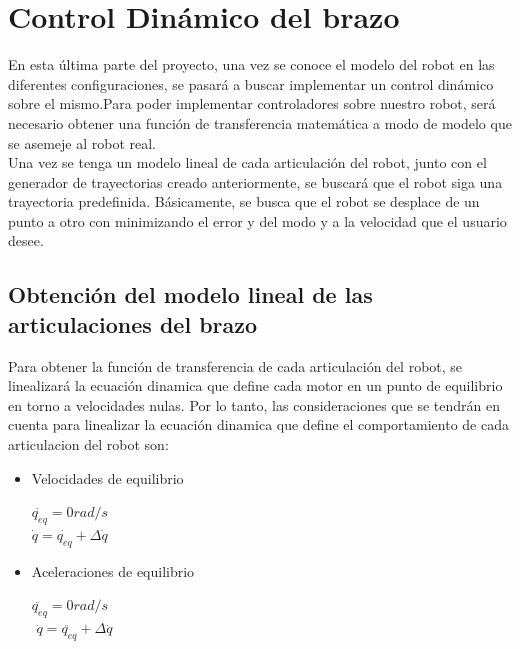 \section{Control Dinámico del brazo}
En esta última parte del proyecto, una vez se conoce el modelo del robot en las diferentes configuraciones, se pasará a buscar implementar un control dinámico sobre el mismo.Para poder implementar controladores sobre nuestro robot, será necesario obtener una función de transferencia matemática a modo de modelo que se asemeje al robot real.\\
Una vez se tenga un modelo lineal de cada articulación del robot, junto con el generador de trayectorias creado anteriormente, se buscará que el robot siga una trayectoria predefinida. Básicamente, se busca que el robot se desplace de un punto a otro con minimizando el error y del modo y a la velocidad que el usuario desee.\\

	\subsection{Obtención del modelo lineal de las articulaciones del brazo}
Para obtener la función de transferencia de cada articulación del robot, se linealizará la ecuación dinamica que define cada motor en un punto de equilibrio en torno a velocidades nulas. Por lo tanto, las consideraciones que se tendrán en cuenta para linealizar la ecuación dinamica que define el comportamiento de cada articulacion del robot son:
\begin{itemize}
	\item Velocidades de equilibrio
	\begin{center}
		$ \dot{q_{eq}}=0 rad/s $\\
		$ \dot{q} =\dot{q_{eq}}+\Delta\dot{q}$
	\end{center}
	\item Aceleraciones de equilibrio
\begin{center}
	$ \ddot{q_{eq}}=0 rad/s $\\
	$  $
	$ \ddot{q} =\ddot{q_{eq}}+\Delta\ddot{q}$
\end{center}
\end{itemize}


